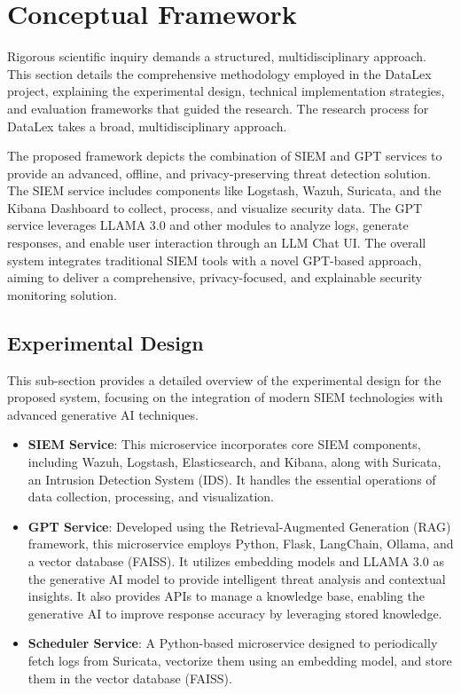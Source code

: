 \section{Conceptual Framework}
\label{sec_conceptual_framework}

Rigorous scientific inquiry demands a structured, multidisciplinary approach. This section details the comprehensive methodology employed in the DataLex project, explaining the experimental design, technical implementation strategies, and evaluation frameworks that guided the research. The research process for DataLex takes a broad, multidisciplinary approach.

The proposed framework depicts the combination of SIEM and GPT services to provide an advanced, offline, and privacy-preserving threat detection solution. The SIEM service includes components like Logstash, Wazuh, Suricata, and the Kibana Dashboard to collect, process, and visualize security data. The GPT service leverages LLAMA 3.0 and other modules to analyze logs, generate responses, and enable user interaction through an LLM Chat UI. The overall system integrates traditional SIEM tools with a novel GPT-based approach, aiming to deliver a comprehensive, privacy-focused, and explainable security monitoring solution.

\subsection{Experimental Design}
\label{subsec_experimental_design}

This sub-section provides a detailed overview of the experimental design for the proposed system, focusing on the integration of modern SIEM technologies with advanced generative AI techniques.

\begin{itemize}
    \item \textbf{SIEM Service}: This microservice incorporates core SIEM components, including Wazuh, Logstash, Elasticsearch, and Kibana, along with Suricata, an Intrusion Detection System (IDS). It handles the essential operations of data collection, processing, and visualization.
    \item \textbf{GPT Service}: Developed using the Retrieval-Augmented Generation (RAG) framework, this microservice employs Python, Flask, LangChain, Ollama, and a vector database (FAISS). It utilizes embedding models and LLAMA 3.0 as the generative AI model to provide intelligent threat analysis and contextual insights. It also provides APIs to manage a knowledge base, enabling the generative AI to improve response accuracy by leveraging stored knowledge.
    \item \textbf{Scheduler Service}: A Python-based microservice designed to periodically fetch logs from Suricata, vectorize them using an embedding model, and store them in the vector database (FAISS).
\end{itemize}

